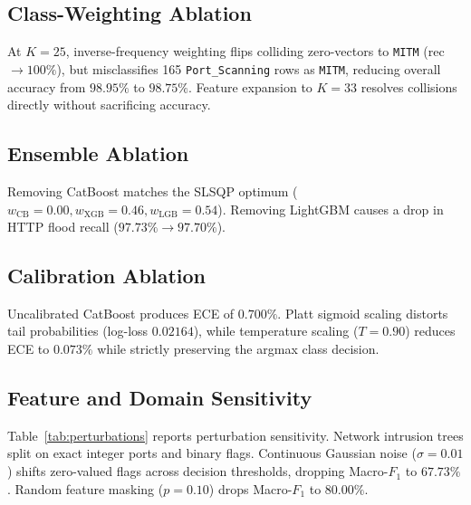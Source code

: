 \documentclass[10pt,journal,twocolumn]{IEEEtran}
\begin{document}
\subsection{Class-Weighting Ablation}
At $K=25$, inverse-frequency weighting flips colliding zero-vectors to \texttt{MITM} (rec $\to 100\%$), but misclassifies 165 \texttt{Port\_Scanning} rows as \texttt{MITM}, reducing overall accuracy from $98.95\%$ to $98.75\%$. Feature expansion to $K=33$ resolves collisions directly without sacrificing accuracy.

\subsection{Ensemble Ablation}
Removing CatBoost matches the SLSQP optimum ($w_{\text{CB}}=0.00, w_{\text{XGB}}=0.46, w_{\text{LGB}}=0.54$). Removing LightGBM causes a drop in HTTP flood recall ($97.73\%\to 97.70\%$).

\subsection{Calibration Ablation}
Uncalibrated CatBoost produces ECE of $0.700\%$. Platt sigmoid scaling distorts tail probabilities (log-loss $0.02164$), while temperature scaling ($T=0.90$) reduces ECE to $0.073\%$ while strictly preserving the argmax class decision.

\subsection{Feature and Domain Sensitivity}
Table~\ref{tab:perturbations} reports perturbation sensitivity. Network intrusion trees split on exact integer ports and binary flags. Continuous Gaussian noise ($\sigma=0.01$) shifts zero-valued flags across decision thresholds, dropping Macro-$F_1$ to $67.73\%$. Random feature masking ($p=0.10$) drops Macro-$F_1$ to $80.00\%$.
\end{document}
